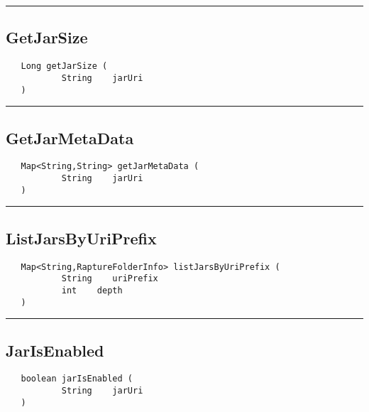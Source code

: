 \rule{15cm}{2pt}
\subsection{GetJarSize}
\label{Api:GetJarSize}
\begin{verbatim}
   Long getJarSize (
           String    jarUri
   )
\end{verbatim}



\rule{15cm}{2pt}
\subsection{GetJarMetaData}
\label{Api:GetJarMetaData}
\begin{verbatim}
   Map<String,String> getJarMetaData (
           String    jarUri
   )
\end{verbatim}



\rule{15cm}{2pt}
\subsection{ListJarsByUriPrefix}
\label{Api:ListJarsByUriPrefix}
\begin{verbatim}
   Map<String,RaptureFolderInfo> listJarsByUriPrefix (
           String    uriPrefix
           int    depth
   )
\end{verbatim}



\rule{15cm}{2pt}
\subsection{JarIsEnabled}
\label{Api:JarIsEnabled}
\begin{verbatim}
   boolean jarIsEnabled (
           String    jarUri
   )
\end{verbatim}



